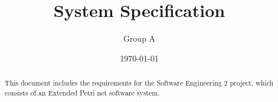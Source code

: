 \documentclass[11pt]{article}   %
\title{System Specification\\ \epns}
\author{Group A}
\date{\today}
\begin{document}
\maketitle

\begin{abstract}
This document includes the requirements for the Software Engineering 2 project, which consists of an Extended Petri net software system.
\end{abstract}

\tableofcontents \newpage








\printindex
\end{document}
